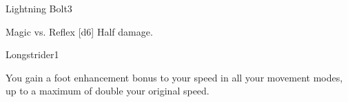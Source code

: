 \begin{spellsection}{Lightning Bolt}{3}
\begin{spellheader}
\end{spellheader}
\begin{spellcontent}
    \begin{spelltargetinginfo}
    \end{spelltargetinginfo}
    \begin{spelleffects}
        \begin{spellattack}{Magic vs. Reflex}
            \spellsuccess {}[d6]
            \spellfailure Half damage.
        \end{spellattack}
    \end{spelleffects}
\end{spellcontent}
\begin{spellfooter}
    \spellnotes \destructivespellnotes
\end{spellfooter}
\end{spellsection}

\begin{spellsection}{Longstrider}{1}
\begin{spellheader}
\end{spellheader}
\begin{spellcontent}
    \begin{spelltargetinginfo}
    \end{spelltargetinginfo}
    \begin{spelleffects}
        \spelleffect You gain a  foot enhancement bonus to your speed in all your movement modes, up to a maximum of double your original speed.
        \spelldur \durlong \dismissable
    \end{spelleffects}
\end{spellcontent}
\begin{spellfooter}
\end{spellfooter}

\begin{comment}
\subsubsection{M}
\end{comment}
\end{spellsection}

